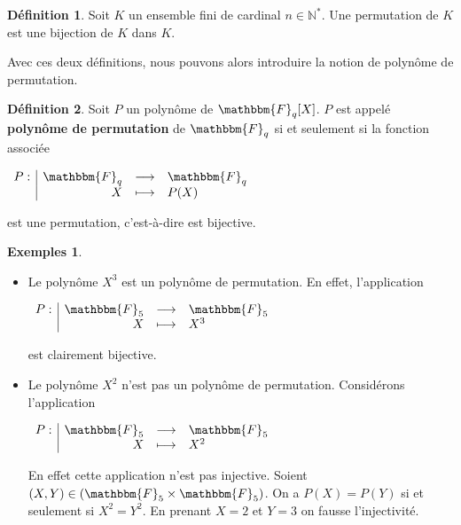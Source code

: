 \documentclass[12pt]{article}
\newcommand{\F}{\mathbbm{F}}
\theoremstyle{definition}
\newtheorem{definition}{Définition}
\newtheorem*{examples}{Exemples}
\begin{document}
\begin{definition}
Soit $K$ un ensemble fini de cardinal $n\in \mathbb{N}^*$. Une permutation de $K$ est une bijection de $K$ dans $K$.
\end{definition}
\vspace{12pt}
Avec ces deux définitions, nous pouvons alors introduire la notion de polynôme de permutation.\\
\begin{definition}
Soit $P$ un polynôme de $\F_q [X]$. $P$ est appelé \textbf{polynôme de permutation} de $\F_q$ si et seulement si la fonction associée
\begin{center}
$
\begin{array}{l|rcl}
\displaystyle
P : & \F _q & \longrightarrow & \F _q \\
    & X & \longmapsto & P(X)
\end{array}
$
\end{center}
est une permutation, c'est-à-dire est bijective.
\end{definition}
\vspace{24pt}
\begin{examples}
	\begin{itemize}
On se place dans $\F_5$.\\
\item[1.] Le polynôme $X^3$ est un polynôme de permutation. En effet, l'application\\
\begin{center}
$
\begin{array}{l|rcl}
\displaystyle
P : & \F _5 & \longrightarrow & \F _5 \\
    & X & \longmapsto & X^3
\end{array}
$
\end{center}
\vspace{10pt}
est clairement bijective.\\
\item[2.] Le polynôme $X^2$ n'est pas un polynôme de permutation. Considérons l'application \\
\begin{center}
$
\begin{array}{l|rcl}
\displaystyle
P : & \F _5 & \longrightarrow & \F _5 \\
    & X & \longmapsto & X^2
\end{array}
$
\end{center}
\vspace{12pt}
En effet cette application n'est pas injective. Soient $(X,Y) \in (\F_5 \times \F_5)$. On a $P(X)=P(Y)$ si et seulement si $X^2=Y^2$. En prenant $X=2$ et $Y=3$ on fausse l'injectivité.
	\end{itemize}
\end{examples}
\end{document}
